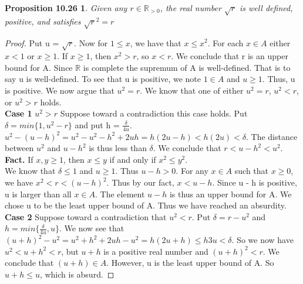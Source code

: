 \documentclass[12pt]{amsart}
\newcommand{\R}{\mathbb{R}}
\begin{document}
\newtheorem*{prop10.26}{Proposition 10.26}
\begin{prop10.26}
	Given any $r \in \R_{>0}$, the real number $\sqrt{r}$ is well defined, positive, and satisfies $\sqrt{r}^2 = r$
\end{prop10.26}

\begin{proof}
	Put u = $\sqrt{r}$. Now for $1 \leq x$, we have that $x \leq x^2$. For each $x \in A$ either $x < 1$ or $x \geq 1$. If $x \geq 1$, then $x^2 > r$, so $x < r$.  We conclude that r is an upper bound for A. Since $\R$ is complete the supremum of A is well-defined. That is to say u is well-defined. To see that u is positive, we note $1 \in A$ and $u \geq 1$. Thus, u is positive. We now argue that $u^2 = r$. We know that one of either $u^2 = r$, $u^2 < r$, or $u^2 > r$ holds. 
	\\\indent\textbf{Case 1} $u^2 > r$ Suppose toward a contradiction this case holds. Put $\delta = min\{1,u^2 - r\}$ and put h = $\frac{\delta}{4u}$. $u^2 - (u - h)^2 = u^2 - u^2 - h^2 + 2uh = h(2u-h) < h(2u) < \delta$. The distance between $u^2$ and $u - h^2$ is thus less than $\delta$. We conclude that $r < u - h^2 < u^2$.
	\\\textbf{Fact.} If $x,y \geq 1$, then $x \leq y$ if and only if $x^2 \leq y^2$.
	\\We know that $\delta \leq 1$ and $u \geq 1$. Thus $u - h > 0$. For any $x \in A$ such that $x \geq 0$, we have $x^2 < r < (u - h)^2$. Thus by our fact, $x < u - h$. Since u - h is positive, u is larger than all $x \in A$. The element $u - h$ is thus an upper bound for A. We chose u to be the least upper bound of A. Thus we have reached an absurdity.
	\\\indent\textbf{Case 2} Suppose toward a contradiction that $u^2 < r$. Put $\delta = r - u^2$ and $h = min\{\frac{\delta}{4u},u\}$. We now see that $(u + h)^2 - u^2 = u^2 + h^2 + 2uh - u^2 = h(2u + h) \leq h3u < \delta$. So we now have $u^2 < u + h^2 < r$, but $u + h$ is a positive real number and $(u + h)^2 < r$. We conclude that $(u + h) \in A$. However, u is the least upper bound of A. So $u + h \leq u$, which is absurd.
\end{proof}
\end{document}
